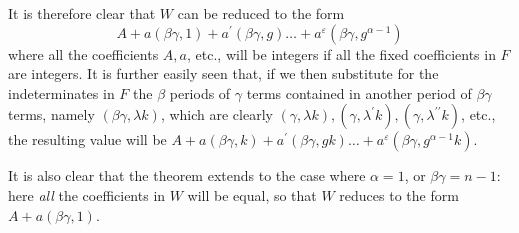 It is therefore clear that \(W\) can be reduced to the form \[A+a(\beta\gamma,1)+a^{\prime}(\beta\gamma,g)\ldots+a^\varepsilon(\beta\gamma,g^{\alpha-1})\] where all the coefficients \(A,\allowbreak a\), etc., will be integers if all the fixed coefficients in \(F\) are integers. It is further easily seen that, if we then substitute for the indeterminates in \(F\) the \(\beta\) periods of \(\gamma\) terms contained in another period of \(\beta\gamma\) terms, namely \((\beta\gamma,\lambda k)\), which are clearly \((\gamma,\lambda k),\allowbreak (\gamma,\lambda^{\prime}k),\allowbreak (\gamma,\lambda^{\prime\prime}k)\), etc., the resulting value will be \(A+a(\beta\gamma,k)+a^{\prime}(\beta\gamma,gk)\ldots+a^\varepsilon(\beta\gamma,g^{\alpha-1}k)\).

It is also clear that the theorem extends to the case where \(\alpha=1\), or \(\beta\gamma=n-1\): here \textit{all} the coefficients in \(W\) will be equal, so that \(W\) reduces to the form \(A+a(\beta\gamma,1)\).


